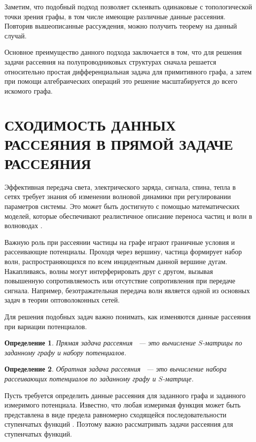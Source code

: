\documentclass[a4 paper, 12 pt]{extarticle}
\newtheorem{Def}{Определение}[section]
\begin{document}
   Заметим, что подобный подход позволяет склеивать одинаковые с топологической точки зрения графы, в том числе имеющие различные данные рассеяния. Повторив вышеописанные рассуждения, можно получить теорему на данный случай.
   
   Основное преимущество данного подхода заключается в том, что для решения задачи рассеяния на полупроводниковых структурах сначала решается относительно простая дифференциальная задача для примитивного графа, а затем при помощи алгебраических операций это решение масштабируется до всего искомого графа.
   
   \section{СХОДИМОСТЬ ДАННЫХ РАССЕЯНИЯ В ПРЯМОЙ ЗАДАЧЕ РАССЕЯНИЯ}
   
   Эффективная передача света, электрического заряда, сигнала, спина, тепла в сетях требует знания об изменении волновой динамики при регулировании параметров системы. Это может быть достигнуто с помощью математических моделей, которые обеспечивают реалистичное описание переноса частиц и волн в волноводах \cite{TransparentQuantumGraphs}.
   
   Важную роль при рассеянии частицы на графе играют граничные условия и рассеивающие потенциалы. Проходя через вершину, частица формирует набор волн, распространяющихся по всем инцидентным данной вершине дугам. Накапливаясь, волны могут интерферировать друг с другом, вызывая повышенную сопротивляемость или отсутствие сопротивления при передаче сигнала.
   Например, безотражательная передача волн является одной из основных задач в теории оптоволоконных сетей.
   
   Для решения подобных задач важно понимать, как изменяются данные рассеяния при вариации потенциалов.
   
   \begin{Def}
   	Прямая задача рассеяния ~--- это вычисление $S$-матрицы по заданному  графу и набору потенциалов.
   \end{Def}

   \begin{Def}
   	Обратная задача рассеяния ~--- это вычисление набора рассеивающих потенциалов по заданному графу и $S$-матрице.
   \end{Def}

   Пусть требуется определить данные рассеяния для заданного графа и заданного измеримого потенциала. Известно, что любая измеримая функция может быть представлена в виде предела равномерно сходящейся последовательности ступенчатых функций \cite{Kolmogorov}. Поэтому важно рассматривать задачи рассеяния для ступенчатых функций.
   
\end{document}
